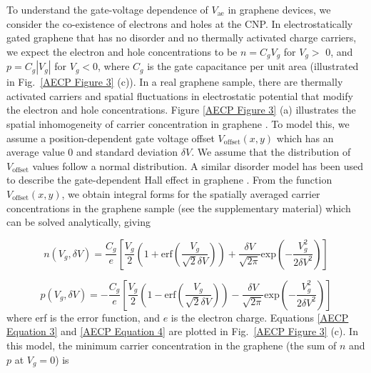 \documentclass[double,12pt,1in,seploa]{beavtex}
\begin{document}
To understand the gate-voltage dependence of $V_{\mathrm{ae}}$ in graphene devices, we consider the co-existence of electrons and holes at the CNP. In electrostatically gated graphene that has no disorder and no thermally activated charge carriers, we expect the electron and hole concentrations to be $n = C_g V_g$ for $V_g >$ 0, and $p = C_g |V_g|$ for $V_g < 0$, where $C_g$ is the gate capacitance per unit area (illustrated in Fig.\ \ref{AECP Figure 3} (c)). In a real graphene sample, there are thermally activated carriers and spatial fluctuations in electrostatic potential that modify the electron and hole concentrations. Figure \ref{AECP Figure 3} (a) illustrates the spatial inhomogeneity of carrier concentration in graphene \cite{martin_observation_2008}. To model this, we assume a position-dependent gate voltage offset $V_{\mathrm{offset}}(x,y)$ which has an average value 0 and standard deviation $\delta V$. We assume that the distribution of $V_{\mathrm{offset}}$ values follow a normal distribution. A similar disorder model has been used to describe the gate-dependent Hall effect in graphene \cite{brown_hall_2019}. From the function $V_{\mathrm{offset}}(x,y)$, we obtain integral forms for the spatially averaged carrier concentrations in the graphene sample (see the supplementary material) which can be solved analytically, giving


\begin{equation}
    n(V_g, \delta V) = \frac{C_g}{e}\left[\frac{V_g}{2}\left(1+\mathrm{erf}\left(\frac{V_g}{\sqrt{2}\delta V}\right)\right)+\frac{\delta V}{\sqrt{2\pi}}\mathrm{exp}\left(-\frac{V_g^2}{2\delta V^2}\right)\right]
    \label{AECP Equation 3}
\end{equation}

\begin{equation}
    p(V_g, \delta V) = -\frac{C_g}{e}\left[\frac{V_g}{2}\left(1-\mathrm{erf}\left(\frac{V_g}{\sqrt{2}\delta V}\right)\right)-\frac{\delta V}{\sqrt{2\pi}}\mathrm{exp}\left(-\frac{V_g^2}{2\delta V^2}\right)\right]
    \label{AECP Equation 4}
\end{equation}
where erf is the error function, and $e$ is the electron charge. Equations \ref{AECP Equation 3} and \ref{AECP Equation 4} are plotted in Fig.\ \ref{AECP Figure 3} (c). In this model, the minimum carrier concentration in the graphene (the sum of $n$ and $p$ at $V_g = 0$) is 
\end{document}
